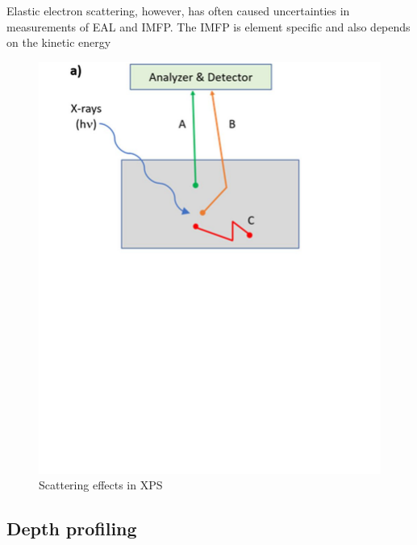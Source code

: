 Elastic electron scattering, however, has often caused uncertainties in measurements of EAL and IMFP. 
The IMFP is element specific and also depends on the kinetic energy 
\begin{figure}
    \centering
    \includegraphics[scale=0.3]{Figures/image6_1.png}
    \caption{Scattering effects in XPS \cite{stevie_introduction_2020}}
    \label{fig:scattering}
\end{figure}

\subsection{Depth profiling}

